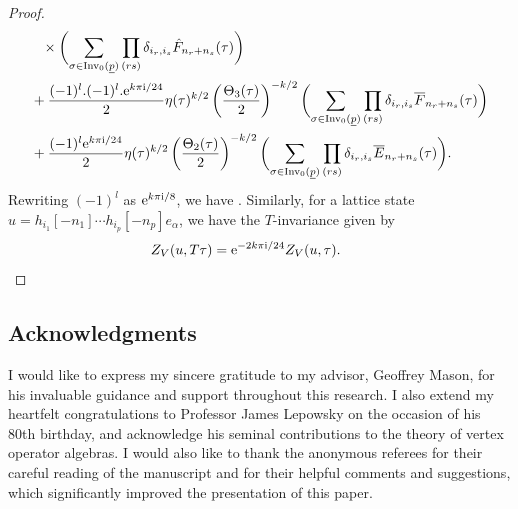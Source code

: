 \documentclass[pdftex]{sigma}
\numberwithin{equation}{section}
\theoremstyle{definition}
\begin{document}
\begin{proof}
\begin{align*}
 &\phantom{+}{}\times \biggl(\sum_{\sigma\in \operatorname{Inv}_0(\underline{p})} \prod_{(rs)}\delta_{i_r,i_s}\hat{F}_{n_r+n_s}(\tau) \biggr)\\
 &+\frac{(-1)^l.(-1)^l.{\rm e}^{k\pi {\rm i}/24}}{2}\eta(\tau)^{k/2}\left(\frac{\Theta_3(\tau)}{2}\right)^{-k/2}\biggl(\sum_{\sigma\in \operatorname{Inv}_0(\underline{p})}\prod_{(rs)}\delta_{i_r,i_s}\overline{F}_{n_r+n_s}(\tau)\biggr)\\
 &+\frac{(-1)^l{\rm e}^{k\pi {\rm i}/24}}{2}\eta(\tau)^{k/2}\left(\frac{\Theta_2(\tau)}{2}\right)^{-k/2}\biggl(\sum_{\sigma\in \operatorname{Inv}_0(\underline{p})}\prod_{(rs)}\delta_{i_r,i_s}\overline{E}_{n_r+n_s}(\tau)\biggr).
 \end{align*}
 Rewriting $(-1)^l$ as ${\rm e}^{k\pi {\rm i}/8}$, we have
.
Similarly, for a lattice state $u=h_{i_1}[-n_1]\cdots h_{i_p}[-n_p]e_{\alpha}$, we have the $T$-invariance given by
\[
Z_V(u,T\tau)={\rm e}^{-2k\pi {\rm i}/24}Z_V(u,\tau).
\tag*{\qed}
\]\renewcommand{\qed}{}
\end{proof}

\subsection*{Acknowledgments}

I would like to express my sincere gratitude to my advisor, Geoffrey Mason, for his invaluable guidance and support throughout this research. I also extend my heartfelt congratulations to Professor James Lepowsky on the occasion of his 80th birthday, and acknowledge his seminal contributions to the theory of vertex operator algebras. I would also like to thank the anonymous referees for their careful reading of the manuscript and for their helpful comments and suggestions, which significantly improved the presentation of this paper.
\end{document}
